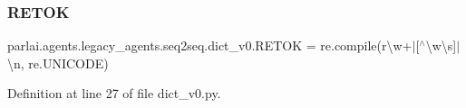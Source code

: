 \subsubsection{\texorpdfstring{R\+E\+T\+OK}{RETOK}}
{\footnotesize\ttfamily parlai.\+agents.\+legacy\+\_\+agents.\+seq2seq.\+dict\+\_\+v0.\+R\+E\+T\+OK = re.\+compile(r\textquotesingle{}\textbackslash{}w+$\vert$\mbox{[}$^\wedge$\textbackslash{}w\textbackslash{}s\mbox{]}$\vert$\textbackslash{}n\textquotesingle{}, re.\+U\+N\+I\+C\+O\+DE)}



Definition at line 27 of file dict\+\_\+v0.\+py.

